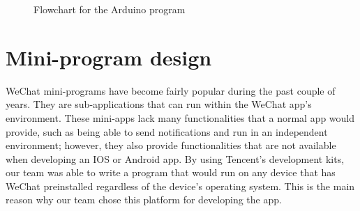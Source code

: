 \documentclass[12pt,a4paper]{report}
\begin{document}
\begin{figure}[H]
	\caption{Flowchart for the Arduino program}
\end{figure}

\section{Mini-program design}
WeChat mini-programs have become fairly popular during the past couple of years. They are sub-applications that can run within the WeChat app's environment. These mini-apps lack many functionalities that a normal app would provide, such as being able to send notifications and run in an independent environment; however, they also provide functionalities that are not available when developing an IOS or Android app. By using Tencent's development kits, our team was able to write a program that would run on any device that has WeChat preinstalled regardless of the device's operating system. This is the main reason why our team chose this platform for developing the app.
\end{document}

